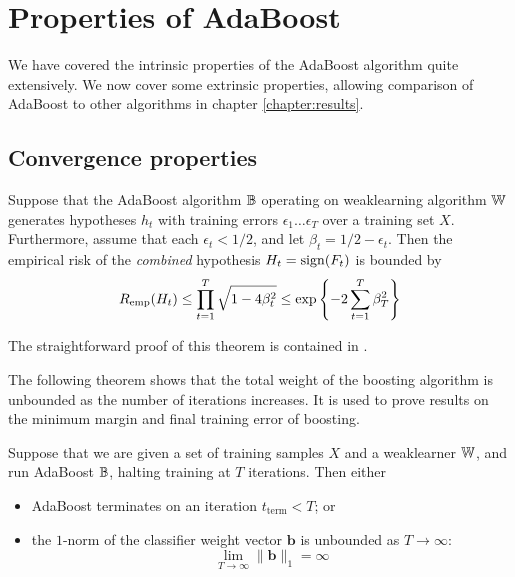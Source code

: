 \section{Properties of AdaBoost}

We have covered the intrinsic properties of the AdaBoost algorithm quite
extensively.  We now cover some extrinsic properties, allowing
comparison of AdaBoost to other algorithms in chapter
\ref{chapter:results}.

\subsection{Convergence properties}

\begin{theorem}
\label{thm:AdaBoost training error convergence}
Suppose that the AdaBoost algorithm $\mathbb{B}$ operating on weaklearning
algorithm $\mathbb{W}$ generates hypotheses $h_t$ with training errors
$\epsilon_1 \ldots \epsilon_T$ over a training set $X$.  Furthermore,
assume that each $\epsilon_t < 1/2$, and let $\beta_t = 1/2 -
\epsilon_t$.  Then the empirical risk of the \emph{combined}
hypothesis $H_t = \mathrm{sign}(F_t)$ is bounded by
%
\begin{equation}
R_{\mathrm{emp}}(H_t) \leq \prod_{t=1}^{T} \sqrt{1 - 4 \beta_t^2} \leq \exp
\left\{ - 2 \sum_{t=1}^T \beta_T^2 \right\}
\end{equation}
\end{theorem}

\proof The straightforward proof of this theorem is contained in
\cite{Freund97}.

The following theorem shows that the total weight of the boosting
algorithm is unbounded as the number of iterations increases.  It is
used to prove results on the minimum margin and final training error
of boosting.

\begin{theorem}
\label{thm:classifier weights unbounded}
Suppose that we are given a set of training samples $X$ and a
weaklearner $\mathbb{W}$, and run AdaBoost $\mathbb{B}$, halting training at $T$
iterations.  Then either
%
\begin{itemize}
\item	AdaBoost terminates on an iteration $t_{\mathrm{term}} < T$;
	or
\item	the $1$-norm of the classifier weight vector $\mathbf{b}$ is
	unbounded as $T \rightarrow \infty$:
	\begin{equation}
	\lim_{T \rightarrow \infty} \| \mathbf{b} \|_1 = \infty
	\end{equation}
\end{itemize}
\end{theorem}

